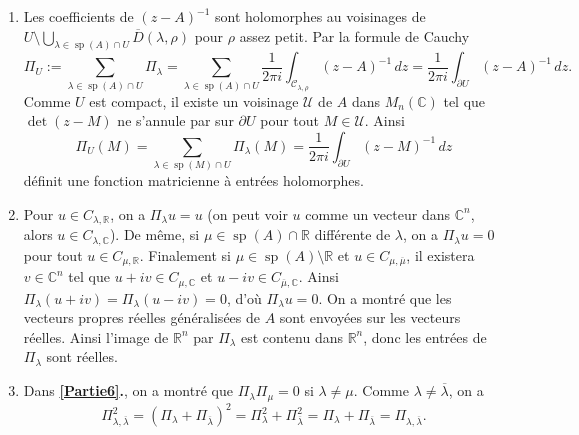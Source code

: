 \documentclass[french]{article}
\theoremstyle{definition}
\newcommand{\ol}[1]{\overline{#1}}
\newcommand{\Cbb}{\mathbb{C}}
\newcommand{\Rbb}{\mathbb{R}}
\newcommand{\Ccal}{\mathcal{C}}
\newcommand{\Ucal}{\mathcal{U}}
\newcommand{\spec}{\operatorname{sp}}
\begin{document}
\begin{enumerate}
    \item \label{Partie7} Les coefficients de $(z-A)^{-1}$ sont holomorphes au voisinages de $U \setminus \bigcup\limits_{\lambda \in \spec(A) \cap U} \ol{D}(\lambda,\rho)$ pour $\rho$ assez petit. Par la formule de Cauchy
        $$\Pi_U := \sum_{\lambda \in \spec(A) \cap U} \Pi_\lambda = \sum_{\lambda \in \spec(A) \cap U} \frac{1}{2\pi i} \int_{\Ccal_{\lambda,\rho}} (z - A)^{-1}\,dz = \frac{1}{2\pi i} \int_{\partial U} (z - A)^{-1}\,dz.$$
    Comme $U$ est compact, il existe un voisinage $\Ucal$ de $A$ dans $M_n(\Cbb)$ tel que $\det(z-M)$ ne s'annule par sur $\partial U$ pour tout $M \in \Ucal$. Ainsi
        $$\Pi_U(M) = \sum_{\lambda \in \spec(M) \cap U} \Pi_\lambda(M) = \frac{1}{2\pi i} \int_{\partial U} (z - M)^{-1}\,dz$$
    d\'efinit une fonction matricienne \`a entr\'ees holomorphes.
    
    \item \label{Partie8} Pour $u \in C_{\lambda, \Rbb}$, on a $\Pi_\lambda u = u$ (on peut voir $u$ comme un vecteur dans $\Cbb^n$, alors $u \in C_{\lambda,\Cbb}$). De m\^eme, si $\mu \in 
    \spec(A) \cap \Rbb$ diff\'erente de $\lambda$, on a $\Pi_\lambda u = 0$ pour tout $u \in C_{\mu,\Rbb}$. Finalement si $\mu \in \spec(A) \setminus \Rbb$ et $u \in C_{\mu,\ol{\mu}}$, il existera $v \in \Cbb^n$ tel que $u + iv \in C_{\mu,\Cbb}$ et $u - iv \in C_{\ol{\mu},\Cbb}$. Ainsi $\Pi_\lambda(u + iv) = \Pi_\lambda(u - iv) = 0$,  d'o\`u $\Pi_\lambda u = 0$. On a montr\'e que les vecteurs propres r\'eelles g\'en\'eralis\'ees de $A$ sont envoy\'ees sur les vecteurs r\'eelles. Ainsi l'image de $\Rbb^n$ par $\Pi_\lambda$ est contenu dans $\Rbb^n$, donc les entr\'ees de $\Pi_\lambda$ sont r\'eelles.
    
    \item \label{Partie9} Dans {\bf \ref{Partie6}.}, on a montr\'e que $\Pi_\lambda \Pi_\mu = 0$ si $\lambda \neq \mu$. Comme $\lambda \neq \ol{\lambda}$, on a
        $$\Pi_{\lambda,\ol{\lambda}}^2 = (\Pi_\lambda + \Pi_{\ol{\lambda}})^2 = \Pi_\lambda^2 + \Pi_{\ol{\lambda}}^2 =  \Pi_\lambda + \Pi_{\ol{\lambda}} = \Pi_{\lambda,\ol{\lambda}}.$$
        

\end{enumerate}
\end{document}
